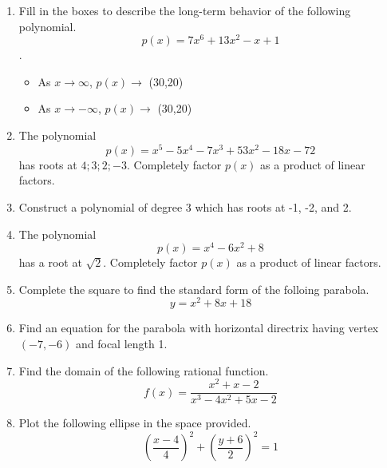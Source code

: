 \documentclass{article}
\begin{document}
\TestTitle[class={College Algebra}, name={Test 3}, term={Spring}, date={Oct. 19}, year={2015}, form={A}]

\AlgebraFacts[geom={show}]

\begin{enumerate}
\item Fill in the boxes to describe the long-term behavior of the following polynomial. \[ p(x) = 7x^6 + 13x^2 - x + 1 \].

\begin{itemize}
\item As $x \rightarrow \infty$, $p(x) \rightarrow$ \framebox(30,20){} \vspace{0.5cm}
\item As $x \rightarrow -\infty$, $p(x) \rightarrow$ \framebox(30,20){}
\end{itemize} \vspace{1cm}

\item The polynomial \[ p(x) = x^5 - 5x^4 - 7x^3 + 53x^2 - 18x - 72 \] has roots at ${4;3;2;-3}$. Completely factor $p(x)$ as a product of linear factors. \vspace{6cm}

\item Construct a polynomial of degree 3 which has roots at -1, -2, and 2. \vspace{5cm}

\newpage

\item The polynomial \[ p(x) = x^4 - 6x^2 + 8 \] has a root at $\sqrt{2}$. Completely factor $p(x)$ as a product of linear factors. \vspace{9cm}

\item Complete the square to find the standard form of the folloing parabola. \[ y = x^2 + 8x + 18 \] \vspace{6cm}

\item Find an equation for the parabola with horizontal directrix having vertex $(-7, -6)$ and focal length 1. \vspace{2cm}

\newpage

\item Find the domain of the following rational function. \[ f(x) = \frac{x^2 + x - 2}{x^3 - 4x^2 + 5x - 2} \] \vspace{5cm}

\item Plot the following ellipse in the space provided. \[ \left(\frac{x - 4}{4}\right)^2 + \left(\frac{y + 6}{2}\right)^2 = 1 \]


\end{enumerate}
\end{document}

